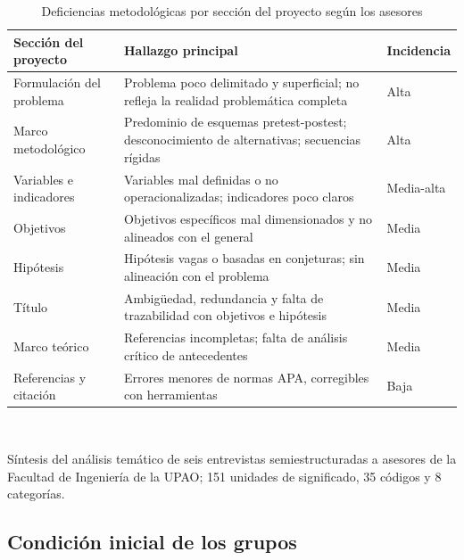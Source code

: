 \documentclass[journal]{IEEEtran}
\begin{document}
\begin{table}[!t]
\caption{Deficiencias metodológicas por sección del proyecto según los asesores}
\label{tab:interviews}
\centering
\footnotesize
\begin{tabular}{L{1.9cm}L{4.4cm}L{1.2cm}}
\toprule
Sección del proyecto & Hallazgo principal & Incidencia \\
\midrule
Formulación del problema & Problema poco delimitado y superficial; no refleja la realidad problemática completa & Alta \\
Marco metodológico & Predominio de esquemas pretest-postest; desconocimiento de alternativas; secuencias rígidas & Alta \\
Variables e indicadores & Variables mal definidas o no operacionalizadas; indicadores poco claros & Media-alta \\
Objetivos & Objetivos específicos mal dimensionados y no alineados con el general & Media \\
Hipótesis & Hipótesis vagas o basadas en conjeturas; sin alineación con el problema & Media \\
Título & Ambigüedad, redundancia y falta de trazabilidad con objetivos e hipótesis & Media \\
Marco teórico & Referencias incompletas; falta de análisis crítico de antecedentes & Media \\
Referencias y citación & Errores menores de normas APA, corregibles con herramientas & Baja \\
\bottomrule
\end{tabular}
\\[2pt]
\raggedright\scriptsize Síntesis del análisis temático de seis entrevistas semiestructuradas a asesores de la Facultad de Ingeniería de la UPAO; 151 unidades de significado, 35 códigos y 8 categorías.
\end{table}

\subsection{Condición inicial de los grupos}
\end{document}
